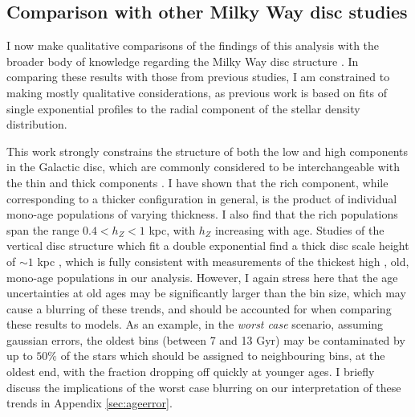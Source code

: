 \subsection{Comparison with other Milky Way disc studies}
I now make qualitative comparisons of the findings of this analysis with the broader body of knowledge regarding the Milky Way disc structure \citep[see, e.g.][for recent reviews]{2013A&ARv..21...61R,2016ARA&A..54..529B}. In comparing these results with those from previous studies, I am constrained to making mostly qualitative considerations, as previous work is based on fits of single exponential profiles to the radial component of the stellar density distribution.

This work strongly constrains the structure of both the low and high \afe{} components in the Galactic disc, which are commonly considered to be interchangeable with the thin and thick components \citep[as asserted by, e.g.][]{2004A&A...415..155B,2012A&A...545A..32A,1998A&A...338..161F}. I have shown that the \afe{} rich component, while corresponding to a thicker configuration in general, is the product of individual mono-age populations of varying thickness. I also find that the \afe{} rich populations span the range  $ 0.4 < h_Z < 1$ kpc, with $h_Z$ increasing with age. Studies of the vertical disc structure which fit a double exponential find a thick disc scale height of $\sim 1$ kpc  \citep[e.g.][]{1983MNRAS.202.1025G,2008ApJ...673..864J}, which is fully consistent with measurements of the thickest high \afe{}, old, mono-age populations in our analysis. However, I again stress here that the age uncertainties at old ages may be significantly larger than the bin size, which may cause a blurring of these trends, and should be accounted for when comparing these results to models. As an example, in the \emph{worst case} scenario, assuming gaussian errors, the oldest bins (between 7 and 13 Gyr) may be contaminated by up to $50\%$ of the stars which should be assigned to neighbouring bins, at the oldest end, with the fraction dropping off quickly at younger ages. I briefly discuss the implications of the worst case blurring on our interpretation of these trends in Appendix \ref{sec:ageerror}.

